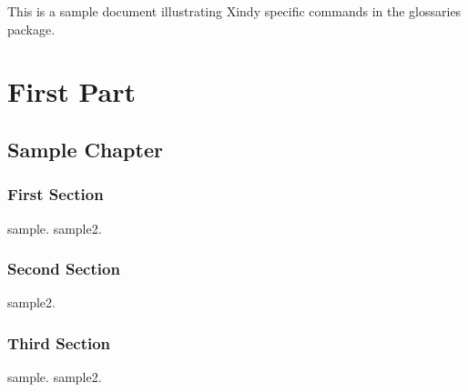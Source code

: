 \documentclass{report}
\begin{document}
This is a sample document illustrating Xindy specific commands in
the glossaries package.

\part{First Part}

\chapter{Sample Chapter}

\section{First Section}

\gls{sample}. \gls{sample2}.

\section{Second Section}

\gls{sample2}.

\section{Third Section}

\gls{sample}. \gls{sample2}.

\printglossaries
\end{document}
